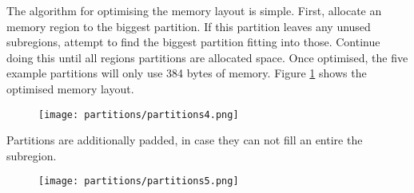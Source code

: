 The algorithm for optimising the memory layout is simple. First, allocate an
memory region to the biggest partition. If this partition leaves any unused
subregions, attempt to find the biggest partition fitting into those. Continue
doing this until all regions partitions are allocated space.
Once optimised, the five example partitions will only use 384 bytes of memory.
Figure \ref{fig:ce4} shows the optimised memory layout.\\
\begin{figure}[H]
\centering
\texttt{[image: partitions/partitions4.png]}
\label{fig:ce4}
\end{figure}
Partitions are additionally padded, in case they can not fill an entire the subregion.\\
\begin{figure}[H]
\centering
\texttt{[image: partitions/partitions5.png]}
\label{fig:ce5}
\end{figure}

